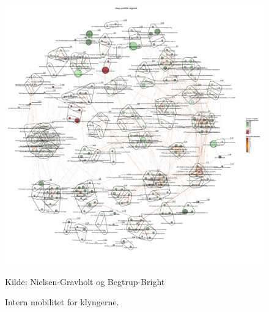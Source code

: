 \begin{figure}[H]
\begin{center}
	\caption{Intern mobilitet for klyngerne.}
	\label{fig_analyse_deskriptivt_kort_intern_mob_seg}
	\includegraphics[width=1.0\textwidth]{fig/netvaerkskort/kort_intern_mob_seg.pdf}
	\centerline{ \tiny{Kilde: Nielsen-Gravholt og Begtrup-Bright}}
\end{center}
\end{figure}
\restoregeometry

